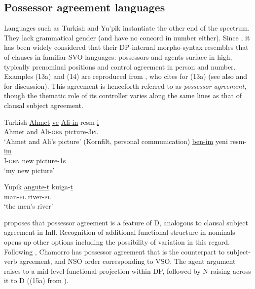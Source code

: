 \documentclass[output=paper
,modfonts
,nonflat]{langsci/langscibook}
\begin{document}
\subsection{Possessor agreement languages}
Languages such as Turkish and Yu'pik instantiate the other end of the spectrum. They lack grammatical gender (and have no concord in number either). Since \citet{Abney1987}, it has been widely considered that their DP-internal morpho-syntax resembles that of clauses in familiar SVO languages: possessors and agents surface in high, typically prenominal positions and control agreement in person and number. Examples (13a) and (14) are reproduced from \citet{Abney1987}, who cites \citet{Underhill1976} for (13a) (see also \citealt{Gavruseva2000} and \citealt{Haegeman2004} for discussion). This agreement is henceforth referred to as \textit{possessor agreement,} though the thematic role of its controller varies along the same lines as that of clausal subject agreement. 

\begin{exe}
	\ex Turkish
	\xlist
	\ex 
	\gll \underline{Ahmet} \underline{ve} \underline{Ali-in}     resm-\underline{i}  \\
	Ahmet and Ali-\textsc{gen}   picture-3\textsc{pl}\\
	\glt `Ahmet and Ali's picture'  	
	\ex (Kornfilt, personal communication) \newline
	\gll \underline{ben-im}   yeni  resm-\underline{im}\\
	I-\textsc{gen}  new   picture-1s\\
	\glt `my new picture'
	\endxlist
\end{exe}

\begin{exe}
	\ex Yupik
	\gll \underline{angute-t}		kuiga-\underline{t}\\
	man-\textsc{pl}    river-\textsc{pl}\\
	\glt `the men's river'  	
\end{exe}
\citet{Abney1987} proposes that possessor agreement is a feature of D, analogous to clausal subject agreement in Infl. Recognition of additional functional structure in nominals opens up other options including the possibility of variation in this regard. Following \citet{Chung1982}, Chamorro has possessor agreement that is the counterpart to subject-verb agreement, and NSO order corresponding to VSO. The agent argument raises to a mid-level functional projection within DP, followed by N-raising across it to D ((15a) from \citealt[127]{Chung1982}).
\end{document}

